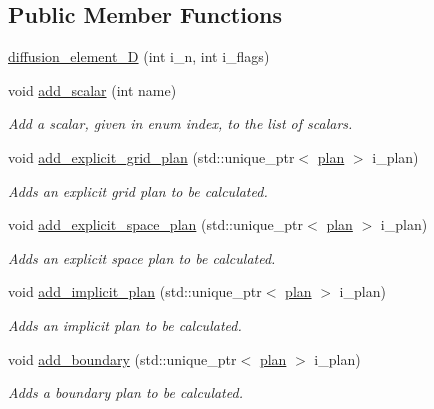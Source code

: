 \subsection*{Public Member Functions}
\begin{DoxyCompactItemize}
\item 
\hyperlink{classelement_1_1diffusion__element__1_d_abc7b6f26e79618a8df95937514a2017a}{diffusion\-\_\-element\-\_\-D} (int i\-\_\-n, int i\-\_\-flags)
\item 
void \hyperlink{classelement_1_1element__1_d_a251eab845adcdf52ab580f6ab9a30ab8}{add\-\_\-scalar} (int name)
\begin{DoxyCompactList}\small\item\em Add a scalar, given in enum index, to the list of scalars. \end{DoxyCompactList}\item 
void \hyperlink{classelement_1_1element_ac3039d96af5371a1455827823250492c}{add\-\_\-explicit\-\_\-grid\-\_\-plan} (std\-::unique\-\_\-ptr$<$ \hyperlink{classplan}{plan} $>$ i\-\_\-plan)
\begin{DoxyCompactList}\small\item\em Adds an explicit grid plan to be calculated. \end{DoxyCompactList}\item 
void \hyperlink{classelement_1_1element_a421ed3d85ec5c88954cceec89b776ffe}{add\-\_\-explicit\-\_\-space\-\_\-plan} (std\-::unique\-\_\-ptr$<$ \hyperlink{classplan}{plan} $>$ i\-\_\-plan)
\begin{DoxyCompactList}\small\item\em Adds an explicit space plan to be calculated. \end{DoxyCompactList}\item 
void \hyperlink{classelement_1_1element_a44598277c572a852065bf99ea50b8dda}{add\-\_\-implicit\-\_\-plan} (std\-::unique\-\_\-ptr$<$ \hyperlink{classplan}{plan} $>$ i\-\_\-plan)
\begin{DoxyCompactList}\small\item\em Adds an implicit plan to be calculated. \end{DoxyCompactList}\item 
void \hyperlink{classelement_1_1element_a0bf9ce6eff52425e8645340174840e07}{add\-\_\-boundary} (std\-::unique\-\_\-ptr$<$ \hyperlink{classplan}{plan} $>$ i\-\_\-plan)
\begin{DoxyCompactList}\small\item\em Adds a boundary plan to be calculated. \end{DoxyCompactList}\item 

\end{DoxyCompactItemize}
